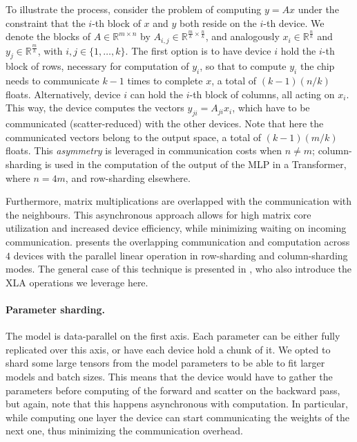 \documentclass{article}
\begin{document}
To illustrate the process, consider the problem of computing $y=Ax$ under the constraint that the $i$-th block of $x$ and $y$ both reside  on the $i$-th device. We denote the blocks of $A\in\mathbb{R}^{m\times n}$ by $A_{i,j}\in\mathbb{R}^{\frac{m}{k}\times\frac{n}{k}}$, and analogously $x_i\in\mathbb{R}^{\frac{n}{k}}$ and  $y_j\in\mathbb{R}^{\frac{m}{k}}$, with $i,j\in\{1,\ldots,k\}$.
The first option is to have device $i$ hold the $i$-th block of rows, necessary for computation of $y_i$, so that to compute $y_i$ the chip needs to communicate $k-1$ times to complete $x$, a total of $(k-1)(n/k)$ floats.
Alternatively, device $i$ can hold the $i$-th block of columns, all acting on $x_i$.
This way, the device computes the vectors $y_{ji}=A_{ji}x_i$, which have to be communicated (scatter-reduced) with the other devices.
Note that here the communicated vectors belong to the output space, a total of $(k-1)(m/k)$ floats.
This \emph{asymmetry} is leveraged in communication costs when $n\neq m$; column-sharding is used in the computation of the output of the MLP in a Transformer, where $n=4m$, and row-sharding elsewhere.

Furthermore, matrix multiplications are overlapped with the communication with the neighbours.
This asynchronous approach allows for high matrix core utilization and increased device efficiency, while minimizing waiting on incoming communication.
 presents the overlapping communication and computation across $4$ devices with the parallel linear operation in row-sharding and column-sharding modes.
The general case of this technique is presented in \citet{wang2022overlap}, who
also introduce the XLA operations we leverage here.

\paragraph{Parameter sharding.}
The model is data-parallel on the first axis.
Each parameter can be either fully replicated over this axis, or have each device hold a chunk of it.
We opted to shard some large tensors from the model parameters to be able to fit larger models and batch sizes.
This means that the device would have to gather the parameters before computing of the forward and scatter on the backward pass, but again, note that this happens asynchronous with computation.
In particular, while computing one layer the device can start communicating the weights of the next one, thus minimizing the communication overhead.
\end{document}

